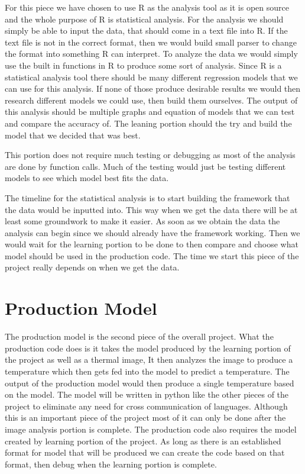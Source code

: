 \documentclass[onecolumn, draftclsnofoot,10pt, compsoc]{IEEEtran}
\begin{document}
For this piece we have chosen to use R as the analysis tool as it is open source and the whole purpose of R is statistical analysis. For the analysis we should simply be able to input the data, that should come in a text file into R. If the text file is not in the correct format, then we would build small parser to change the format into something R can interpret. To analyze the data we would simply use the built in functions in R to produce some sort of analysis. Since R is a statistical analysis tool there should be many different regression models that we can use for this analysis. If none of those produce desirable results we would then research different models we could use, then build them ourselves. The output of this analysis should be multiple graphs and equation of models that we can test and compare the accuracy of. The leaning portion should the try and build the model that we decided that was best.

This portion does not require much testing or debugging as most of the analysis are done by function calls. Much of the testing would just be testing different models to see which model best fits the data.

The timeline for the statistical analysis is to start building the framework that the data would be inputted into. This way when we get the data there will be at least some groundwork to make it easier. As soon as we obtain the data the analysis can begin since we should already have the framework working. Then we would wait for the learning portion to be done to then compare and choose what model should be used in the production code. The time we start this piece of the project really depends on when we get the data.

\section{Production Model}
The production model is the second piece of the overall project. What the production code does is it takes the model produced by the learning portion of the project as well as a thermal image, It then analyzes the image to produce a temperature which then gets fed into the model to predict a temperature. The output of the production model would then produce a single temperature based on the model. The model will be written in python like the other pieces of the project to eliminate any need for cross communication of languages. Although this is an important piece of the project most of it can only be done after the image analysis portion is complete. The production code also requires the model created by learning portion of the project. As long as there is an established format for model that will be produced we can create the code based on that format, then debug when the learning portion is complete.
\end{document}
